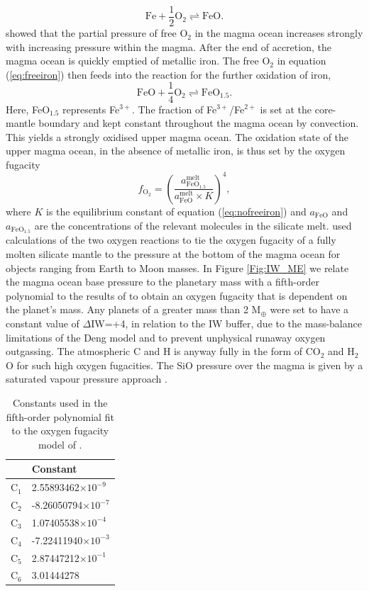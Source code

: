 \documentclass[bibyear,tradiabstract]{aa}
\begin{document}
\begin{equation}\label{eq:freeiron}
    \mathrm{Fe} + \frac{1}{2} \mathrm{O}_2 \rightleftharpoons \mathrm{FeO}.
\end{equation}
\citet{Armstrong+2019} showed that the partial pressure of free O$_2$ in the magma ocean increases strongly with increasing pressure within the magma. After the end of accretion, the magma ocean is quickly emptied of metallic iron. The free O$_2$ in equation (\ref{eq:freeiron}) then feeds into the reaction for the further oxidation of iron,
\begin{equation}\label{eq:nofreeiron}
    \mathrm{FeO} + \frac{1}{4}\mathrm{O}_2 \rightleftharpoons \mathrm{FeO}_{1.5}.
\end{equation}
Here, FeO$_{1.5}$ represents Fe$^{3+}$. The fraction of Fe$^{3+}$/Fe$^{2+}$ is set at the core-mantle boundary and kept constant throughout the magma ocean by convection. This yields a strongly oxidised upper magma ocean. The oxidation state of the upper magma ocean, in the absence of metallic iron, is thus set by the oxygen fugacity
\begin{equation}
    f_{\mathrm{O}_2}=\left(\frac{a^{\mathrm{melt}}_{\mathrm{FeO_{1.5}}}}
    {a^{\mathrm{melt}}_{\mathrm{FeO}}\times K}\right)^4,
\end{equation}
where $K$ is the equilibrium constant of equation (\ref{eq:nofreeiron}) and $a_{\mathrm{FeO}}$ and $a_{\mathrm{FeO}_{1.5}}$ are the concentrations of the relevant molecules in the silicate melt. \citet{Deng+2020} used calculations of the two oxygen reactions to tie the oxygen fugacity of a fully molten silicate mantle to the pressure at the bottom of the magma ocean for objects ranging from Earth to Moon masses. In Figure \ref{Fig:IW_ME} we relate the magma ocean base pressure to the planetary mass with a fifth-order polynomial to the results of \cite{Deng+2020} to obtain an oxygen fugacity that is dependent on the planet's mass. Any planets of a greater mass than 2 M$_{\oplus}$ were set to have a constant value of $\Delta$IW=+4, in relation to the IW buffer, due to the mass-balance limitations of the Deng model and to prevent unphysical runaway oxygen outgassing. The atmospheric C and H is anyway fully in the form of CO$_2$ and H$_2$O  for such high oxygen fugacities. The SiO pressure over the magma is given by a saturated vapour pressure approach \citep{Johansen+2023II}.\\
\begin{table}[]
\centering
\caption{Constants used in the fifth-order polynomial fit to the oxygen fugacity model of \cite{Deng+2020}.}
\begin{tabular}{l|l}\label{table:1}
 & Constant \\ \hline
C$_1$ & 2.55893462$\times10^{-9}$  \\ \hline
C$_2$ & -8.26050794$\times10^{-7}$ \\ \hline
C$_3$ & 1.07405538$\times10^{-4}$\\ \hline
C$_4$ & -7.22411940$\times10^{-3}$\\ \hline
C$_5$ & 2.87447212$\times10^{-1}$\\ \hline
C$_6$ & 3.01444278
\end{tabular}
\end{table}
\end{document}
